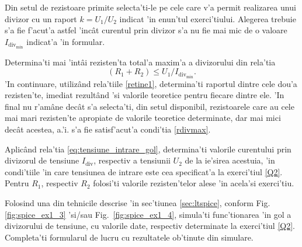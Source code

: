 %
%
\begin{exercise} \label{Q2}
Din setul de rezistoare primite selecta'ti-le pe cele care v'a permit realizarea unui divizor cu  un raport $k = U_1/U_2$ indicat 'in enun'tul exerci'tiului. Alegerea trebuie s'a fie f'acut'a astfel 'inc\^at curentul prin divizor s'a nu fie mai mic de o valoare  $I_{\mathrm{div}_{\mathrm{min}}}$   indicat'a 'in formular. 
\end{exercise}
%
\begin{indicatie}
Determina'ti mai 'int\^ai rezisten'ta total'a maxim'a a divizorului din rela'tia 
\begin{equation} \label{rdivmax}
	(R_1 + R_2)\leq U_1/I_{\mathrm{div}_{\mathrm{min}}}.
\end{equation}
 'In continuare, utiliz\^and rela'tiile \eqref{retine1}, determina'ti raportul dintre cele dou'a rezisten'te, imediat rezult\^and 'si valorile teoretice pentru fiecare dintre ele. 'In final nu r'am\^ane dec\^at s'a selecta'ti, din setul disponibil, rezistoarele care au cele mai mari rezisten'te apropiate de valorile teoretice determinate, dar mai mici dec\^at acestea, a.'i. s'a fie satisf'acut'a condi'tia \eqref{rdivmax}. 
\end{indicatie}
%
%
\begin{exercise} \label{Q3}
Aplic\^and rela'tia \eqref{eq:tensiune_intrare_gol}, determina'ti valorile curentului prin divizorul de tensiune $I_{\mathrm{div}}$, respectiv a tensiunii $U_2$ de la ie'sirea acestuia, 'in condi'tiile 'in care tensiunea de intrare este cea specificat'a la exerci'tiul \ref{Q2}. Pentru $R_1$, respectiv $R_2$ folosi'ti valorile rezisten'telor alese 'in acela'si exerci'tiu.  
\end{exercise}
%
%
\begin{exercise}  \label{Q4}
Folosind una din tehnicile descrise 'in sec'tiunea  \ref{sec:ltspice}, conform 
Fig.~ \ref{fig:spice_ex1_3} 'si/sau Fig.~\ref{fig:spice_ex1_4}, simula'ti func'tionarea 'in gol a divizorului de tensiune, cu valorile date, respectiv determinate la exerci'tiul \ref{Q2}. Completa'ti formularul de lucru cu rezultatele ob'tinute din simulare.
\end{exercise}
%
%
